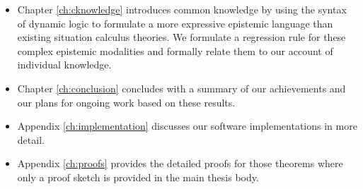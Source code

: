 \begin{itemize}
\item Chapter \ref{ch:cknowledge} introduces common knowledge by using
the syntax of dynamic logic to formulate a more expressive epistemic
language than existing situation calculus theories. We formulate a
regression rule for these complex epistemic modalities and formally
relate them to our account of individual knowledge. 
\item Chapter \ref{ch:conclusion} concludes with a summary of our achievements
and our plans for ongoing work based on these results. 
\item Appendix \ref{ch:implementation} discusses our software implementations
in more detail. 
\item Appendix \ref{ch:proofs} provides the detailed proofs for those theorems
where only a proof sketch is provided in the main thesis body. 
\end{itemize}
